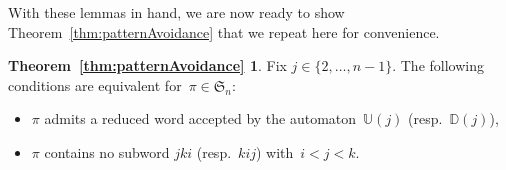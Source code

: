\documentclass[11pt]{article}
\theoremstyle{definition}
\numberwithin{equation}{section}
\newcommand{\fS}{\mathfrak{S}}
\newcommand{\automatonU}{\mathbb{U}}
\newcommand{\automatonD}{\mathbb{D}}
\begin{document}
With these lemmas in hand, we are now ready to show Theorem~\ref{thm:patternAvoidance} that we repeat here for convenience.

\newtheorem*{thm:patternAvoidance}{Theorem~\ref{thm:patternAvoidance}}
\begin{thm:patternAvoidance}
Fix $j \in \{2, \dots, n-1\}$.
The following conditions are equivalent for~${\pi \in \fS_n}$:
\begin{itemize}
	\item $\pi$ admits a reduced word accepted by the automaton~$\automatonU(j)$ (resp.~$\automatonD(j)$),
	\item $\pi$ contains no subword $jki$ (resp.~$kij$) with~$i < j < k$.
\end{itemize}
\end{thm:patternAvoidance}
\end{document}
